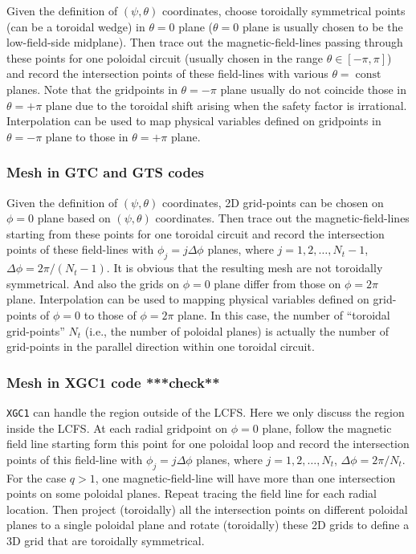 \documentclass{llncs}
\newcommand{\tmop}[1]{\ensuremath{\operatorname{#1}}}
\begin{document}
Given the definition of $(\psi, \theta)$ coordinates, choose toroidally
symmetrical points (can be a toroidal wedge) in $\theta = 0$ plane ($\theta =
0$ plane is usually chosen to be the low-field-side midplane). Then trace out
the magnetic-field-lines passing through these points for one poloidal circuit
(usually chosen in the range $\theta \in [- \pi, \pi]$) and record the
intersection points of these field-lines with various $\theta = \tmop{const}$
planes. Note that the gridpoints in $\theta = - \pi$ plane usually do not
coincide those in $\theta = + \pi$ plane due to the toroidal shift arising
when the safety factor is irrational. Interpolation can be used to map
physical variables defined on gridpoints in $\theta = - \pi$ plane to those in
$\theta = + \pi$ plane.

\subsubsection{Mesh in GTC and GTS codes{\cite{wxwang2006}}}

Given the definition of $(\psi, \theta)$ coordinates, 2D grid-points can be
chosen on $\phi = 0$ plane based on $(\psi, \theta)$ coordinates. Then trace
out the magnetic-field-lines starting from these points for one toroidal
circuit and record the intersection points of these field-lines with $\phi_j =
j \Delta \phi$ planes, where $j = 1, 2, \ldots, N_t - 1$, $\Delta \phi = 2 \pi
/ (N_t - 1)$. It is obvious that the resulting mesh are not toroidally
symmetrical. And also the grids on $\phi = 0$ plane differ from those on $\phi
= 2 \pi$ plane. Interpolation can be used to mapping physical variables
defined on grid-points of $\phi = 0$ to those of $\phi = 2 \pi$ plane. In this
case, the number of ``toroidal grid-points'' $N_t$ (i.e., the number of
poloidal planes) is actually the number of grid-points in the parallel
direction within one toroidal circuit.

\subsubsection{Mesh in XGC1 code ***check**}

{\texttt{XGC1}} can handle the region outside of the LCFS. Here we only
discuss the region inside the LCFS. At each radial gridpoint on $\phi = 0$
plane, follow the magnetic field line starting form this point for one
poloidal loop and record the intersection points of this field-line with
$\phi_j = j \Delta \phi$ planes, where $j = 1, 2, \ldots, N_t$, $\Delta \phi =
2 \pi / N_t$. For the case $q > 1$, one magnetic-field-line will have more
than one intersection points on some poloidal planes. Repeat tracing the field
line for each radial location. Then project (toroidally) all the intersection
points on different poloidal planes to a single poloidal plane and rotate
(toroidally) these 2D grids to define a 3D grid that are toroidally
symmetrical.
\end{document}
